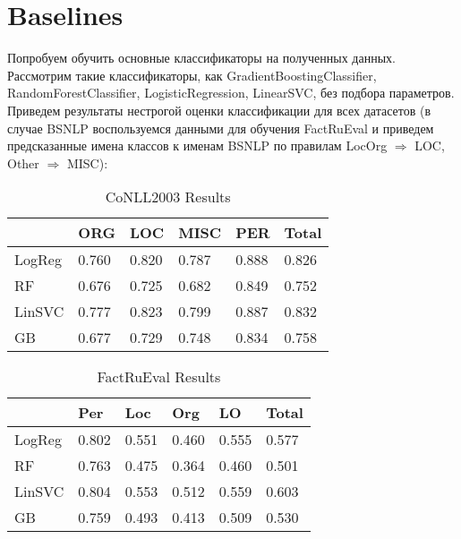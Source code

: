 \section{Baselines}

Попробуем обучить основные классификаторы на полученных данных. Рассмотрим такие классификаторы, как GradientBoostingClassifier, RandomForestClassifier, LogisticRegression, LinearSVC, без подбора параметров. Приведем результаты нестрогой оценки классификации для всех датасетов (в случае BSNLP воспользуемся данными для обучения FactRuEval и приведем предсказанные имена классов к именам BSNLP по правилам LocOrg ${\Rightarrow}$ LOC, Other ${\Rightarrow}$ MISC):


\begin{table}[ht]
\centering
\caption{CoNLL2003 Results}
\label{conll2003}
\begin{tabular}{|l|l|l|l|l|l|}
\hline
            & ORG   & LOC   & MISC  & PER   & Total \\ \hline
LogReg      & 0.760 & 0.820 & 0.787 & 0.888 & 0.826 \\ \hline
RF          & 0.676 & 0.725 & 0.682 & 0.849 & 0.752 \\ \hline
LinSVC      & 0.777 & 0.823 & 0.799 & 0.887 & 0.832 \\ \hline
GB          & 0.677 & 0.729 & 0.748 & 0.834 & 0.758 \\ \hline
\end{tabular}
\end{table}



\begin{table}[ht]
\centering
\caption{FactRuEval Results}
\label{factrueval}
\begin{tabular}{|l|l|l|l|l|l|}
\hline
          & Per    &      Loc & Org   & LO     & Total \\ \hline
LogReg    & 0.802  & 0.551    & 0.460 & 0.555  & 0.577 \\ \hline
RF        & 0.763  & 0.475    & 0.364 & 0.460  & 0.501 \\ \hline
LinSVC    & 0.804  & 0.553    & 0.512 & 0.559  & 0.603 \\ \hline
GB        & 0.759  & 0.493    & 0.413 & 0.509  & 0.530 \\ \hline
\end{tabular}
\end{table}




